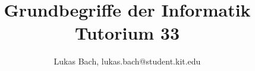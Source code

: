 \ifdefined\compileall

\begin{frame}\vfill\centering \huge{} \vfill\end{frame}

\else
\ifdefined\compiletype
	\documentclass[handout]{beamer}
\else
	\documentclass{beamer}
	\def\compiletype{livebeamer}
\fi

\usepackage{templates/beamerthemekitwide}



\title[Grundbegriffe der Informatik]{Grundbegriffe der Informatik\\Tutorium 33}
\subtitle{}
\author{Lukas Bach, lukas.bach@student.kit.edu}
\date{\tutdate}

\institute{}






%


	


\begin{frame}
	\titlepage
\end{frame}

\ifdefined\printmode
	\ifdefined\compileall \else
	\begin{frame}{Gliederung}
		\tableofcontents
	\end{frame}
\fi\fi

\fi